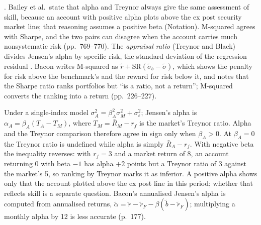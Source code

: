 \begin{qfmethod}
\citep[chap.~12, pp.~767--769, eqs.~(12-17)--(12-21)]{managing-investment-portfolios-2007}. Bailey et al.\ state that alpha and Treynor always give the same assessment of skill, because an account with positive alpha plots above the ex post security market line; that reasoning assumes a positive beta (Notation). M-squared agrees with Sharpe, and the two pairs can disagree when the account carries much nonsystematic risk (pp.~769--770). The \emph{appraisal ratio} (Treynor and Black) divides Jensen's alpha by specific risk, the standard deviation of the regression residual \citep[3rd ed., 2023, chap.~5, p.~190, eq.~(5.61)]{wide-bacon-attribution}. Bacon writes M-squared as $\tilde r+\text{SR}(\tilde\sigma_b-\tilde\sigma)$, which shows the penalty for risk above the benchmark's and the reward for risk below it, and notes that the Sharpe ratio ranks portfolios but ``is a ratio, not a return''; M-squared converts the ranking into a return (pp.~226--227).

 Under a single-index model $\sigma_A^2=\beta_A^2\sigma_M^2+\sigma_\varepsilon^2$; Jensen's alpha is $\alpha_A=\beta_A(T_A-T_M)$, where $T_M=\bar R_M-r_f$ is the market's Treynor ratio. Alpha and the Treynor comparison therefore agree in sign only when $\beta_A>0$. At $\beta_A=0$ the Treynor ratio is undefined while alpha is simply $\bar R_A-r_f$. With negative beta the inequality reverses: with $r_f=3$ and a market return of 8, an account returning 0 with beta $-1$ has alpha $+2$ points but a Treynor ratio of 3 against the market's 5, so ranking by Treynor marks it as inferior. A positive alpha shows only that the account plotted above the ex post line in this period; whether that reflects skill is a separate question. Bacon's annualised Jensen's alpha is computed from annualised returns, $\tilde\alpha=\tilde r-\tilde r_F-\beta(\tilde b-\tilde r_F)$; multiplying a monthly alpha by 12 is less accurate (p.~177).


\end{qfmethod}
